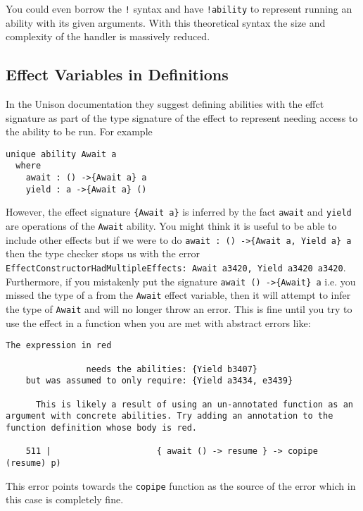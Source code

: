 \documentclass[logo,bsc,singlespacing,parskip]{infthesis}
\begin{document}
You could even borrow the \texttt{!} syntax and have \texttt{!ability} to represent running an ability with its given arguments.
With this theoretical syntax the size and complexity of the handler is massively reduced.

\subsection{Effect Variables in Definitions}

In the Unison documentation \cite{unison-abilities} they suggest defining
abilities with the effct signature as part of the type signature of the effect
to represent needing access to the ability to be run. For example

\begin{lstlisting}[language=unison]
unique ability Await a
  where
    await : () ->{Await a} a
    yield : a ->{Await a} ()
\end{lstlisting}

However, the effect signature \texttt{\{Await a\}} is inferred by the fact
\texttt{await} and \texttt{yield} are operations of the \texttt{Await} ability.
You might think it is useful to be able to include other effects but if we were
to do \texttt{await : () ->\{Await a, Yield a\} a} then the type checker stops
us with the error \texttt{  EffectConstructorHadMultipleEffects: {Await a3420,
Yield a3420} a3420}. Furthermore, if you mistakenly put the signature
\texttt{await () ->\{Await\} a} i.e. you missed the type of a from the
\texttt{Await} effect variable, then it will attempt to infer the type of
\texttt{Await} and will no longer throw an error. This is fine until you try to use the effect in a function when you are met with abstract errors like: 

\begin{lstlisting}[style=terminal]
  The expression in red
  
                needs the abilities: {Yield b3407}
    but was assumed to only require: {Yield a3434, e3439}

      This is likely a result of using an un-annotated function as an argument with concrete abilities. Try adding an annotation to the function definition whose body is red.
  
    511 |                     { await () -> resume } -> copipe (resume) p)
\end{lstlisting}

This error points towards the \texttt{copipe} function as the source of the
error which in this case is completely fine.
\end{document}

